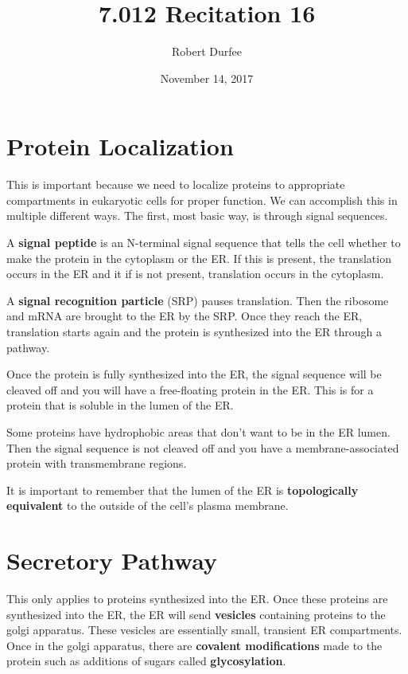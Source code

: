\documentclass{article}
\title{ 7.012 Recitation 16 }
\author{ Robert Durfee }
\date{ November 14, 2017 }
\begin{document}
\maketitle

\section{ Protein Localization }

This is important because we need to localize proteins to appropriate
compartments in eukaryotic cells for proper function. We can accomplish this in
multiple different ways. The first, most basic way, is through signal sequences. 

A \textbf{signal peptide} is an N-terminal signal sequence that tells the cell
whether to make the protein in the cytoplasm or the ER. If this is present, the
translation occurs in the ER and it if is not present, translation occurs in the
cytoplasm.

A \textbf{signal recognition particle} (SRP) pauses translation. Then the
ribosome and mRNA are brought to the ER by the SRP. Once they reach the ER,
translation starts again and the protein is synthesized into the ER through a
pathway.

Once the protein is fully synthesized into the ER, the signal sequence will be
cleaved off and you will have a free-floating protein in the ER. This is for a
protein that is soluble in the lumen of the ER.

Some proteins have hydrophobic areas that don't want to be in the ER lumen. Then
the signal sequence is not cleaved off and you have a membrane-associated 
protein with transmembrane regions.

It is important to remember that the lumen of the ER is \textbf{topologically
equivalent} to the outside of the cell's plasma membrane. 

\section{Secretory Pathway}

This only applies to proteins synthesized into the ER. Once these proteins are
synthesized into the ER, the ER will send \textbf{vesicles} containing proteins
to the golgi apparatus. These vesicles are essentially small, transient ER
compartments. Once in the golgi apparatus, there are \textbf{covalent
modifications} made to the protein such as additions of sugars called
\textbf{glycosylation}.
\end{document}
